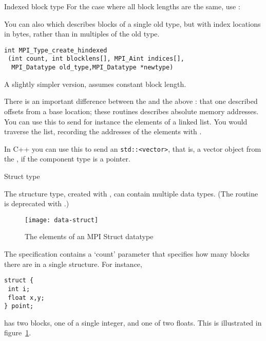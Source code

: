 \begin{mplnote}{Indexed block type}
  For the case where all block lengths are the same,
  use :
\end{mplnote}

You can also  which describes blocks
of a single old type, but with index locations in bytes, rather than
in multiples of the old type.
\begin{lstlisting}
int MPI_Type_create_hindexed
 (int count, int blocklens[], MPI_Aint indices[],
  MPI_Datatype old_type,MPI_Datatype *newtype)
\end{lstlisting}
A slightly simpler version,
assumes constant block length.

There is an important difference between the  and the
above : that one described offsets from
a base location; these routines describes absolute memory addresses.
You can use this to send for instance the elements of a linked
list. You would traverse the list, recording the addresses of the
elements with .

In C++ you can use this to
send an \lstinline{std::<vector>}, that
is, a vector object from the , if
the component type is a pointer.

 {Struct type}
\label{sec:data:struct}

The structure type, created with ,
can contain multiple data types. (The routine
 is deprecated with .)
%
\begin{figure}[t]
  \texttt{[image: data-struct]}
  \caption{The elements of an MPI Struct datatype}
  \label{fig:data-struct}
\end{figure}
%
The specification contains a `count' parameter that specifies how many blocks
there are in a single structure. For instance,
\begin{lstlisting}
struct {
 int i;
 float x,y;
} point;
\end{lstlisting}
has two blocks, one of a single integer, and one of two floats.
This is illustrated in figure~\ref{fig:data-struct}.

